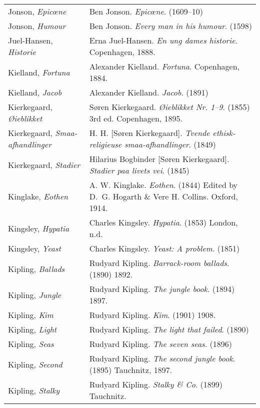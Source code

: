 \begin{longtable}{p{} p{}}
Jonson, \textit{Epicœne} & Ben Jonson. \textit{Epicœne}. (1609--10)\\ %
Jonson, \textit{Humour} & Ben Jonson. \textit{Every man in his humour}. (1598) \\ %
%

Juel-Hansen, \textit{Historie} & Erna Juel-Hansen. \textit{En ung dames historie}. Copenhagen, 1888. \\

Kielland, \textit{Fortuna} & Alexander Kielland. \textit{Fortuna}. Copenhagen, 1884.\\
Kielland, \textit{Jacob} & Alexander Kielland. \textit{Jacob}. (1891) \\

Kierkegaard, \textit{Øieblikket} & Søren Kierkegaard. \textit{Øieblikket Nr. 1–9}. (1855) 3rd ed. Copenhagen, 1895. \\
\raggedright{Kierkegaard, \textit{Smaa-afhandlinger}} & H. H. {[}Søren Kierkegaard{]}. \textit{Tvende ethisk-religieuse smaa-afhandlinger}. (1849) \\
Kierkegaard, \textit{Stadier} & Hilarius Bogbinder {[}Søren Kierkegaard{]}. \textit{Stadier paa livets vei}. (1845) \\

Kinglake, \textit{Eothen} & A. W. Kinglake. \textit{Eothen}. (1844) Edited by D.~G. Hogarth \& Vere H. Collins. Oxford, 1914. \\

Kingsley, \textit{Hypatia} & Charles Kingsley. \textit{Hypatia}. (1853) London, n.d. \\
Kingsley, \textit{Yeast} & Charles Kingsley. \textit{Yeast: A problem}. (1851) \\

Kipling, \textit{Ballads} & Rudyard Kipling. \textit{Barrack-room ballads}. (1890) 1892. \\
Kipling, \textit{Jungle} & Rudyard Kipling. \textit{The jungle book}. (1894) 1897. \\
Kipling, \textit{Kim} & Rudyard Kipling. \textit{Kim}. (1901) 1908. \\
Kipling, \textit{Light} & Rudyard Kipling. \textit{The light that failed}. (1890) \\
Kipling, \textit{Seas} & Rudyard Kipling. \textit{The seven seas}. (1896) \\
Kipling, \textit{Second} & Rudyard Kipling. \textit{The second jungle book}. (1895) Tauchnitz, 1897. \\
Kipling, \textit{Stalky} & Rudyard Kipling. \textit{Stalky \& Co}. (1899) Tauchnitz.  \\
%


\end{longtable}
